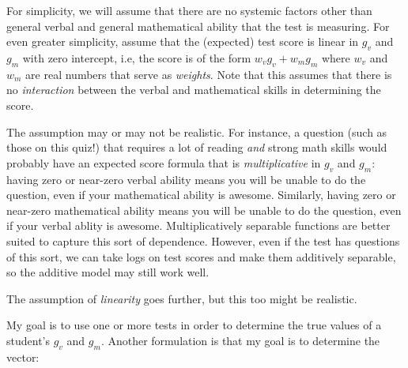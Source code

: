\documentclass[10pt]{amsart}
\begin{document}
For simplicity, we will assume that there are no systemic factors
other than general verbal and general mathematical ability that the
test is measuring. For even greater simplicity, assume that the
(expected) test score is linear in $g_v$ and $g_m$ with zero
intercept, i.e, the score is of the form $w_vg_v + w_mg_m$ where $w_v$
and $w_m$ are real numbers that serve as {\em weights}. Note that this
assumes that there is no {\em interaction} between the verbal and
mathematical skills in determining the score.

The assumption may or may not be realistic. For instance, a question
(such as those on this quiz!) that requires a lot of reading {\em and}
strong math skills would probably have an expected score formula that
is {\em multiplicative} in $g_v$ and $g_m$: having zero or near-zero
verbal ability means you will be unable to do the question, even if
your mathematical ability is awesome. Similarly, having zero or
near-zero mathematical ability means you will be unable to do the
question, even if your verbal ablity is awesome. Multiplicatively
separable functions are better suited to capture this sort of
dependence. However, even if the test has questions of this sort, we
can take logs on test scores and make them additively separable, so
the additive model may still work well.

The assumption of {\em linearity} goes further, but this too might be
realistic.

My goal is to use one or more tests in order to determine the true
values of a student's $g_v$ and $g_m$. Another formulation is that my
goal is to determine the vector:
\end{document}
